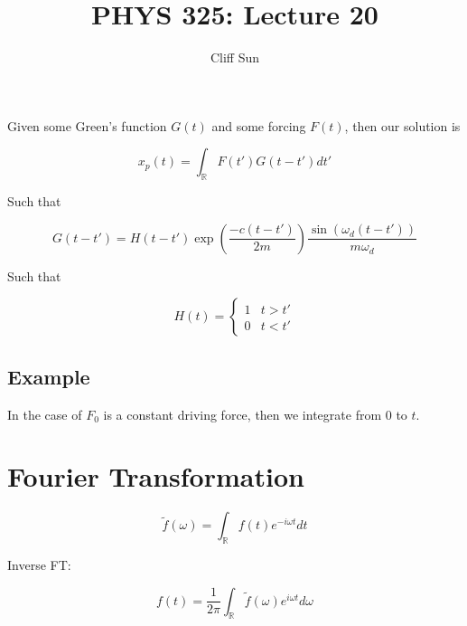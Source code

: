 \documentclass{article}
\title{PHYS 325: Lecture 20}
\author{Cliff Sun}
\newtheorem{one minute paper}[theorem]{One Minute Paper}
\begin{document}
\maketitle

Given some Green's function $G(t)$ and some forcing $F(t)$, then our solution is 

\begin{equation}
    x_p(t) = \int_{\mathbb{R}}F(t')G(t-t')dt'
\end{equation}

Such that 

\begin{equation}
    G(t-t') = H(t-t')\exp\left(\frac{-c(t-t')}{2m}\right)\frac{\sin(\omega_d(t-t'))}{m\omega_d}
\end{equation}

Such that 

\begin{equation}
    H(t) = \begin{cases}
        1 & t > t' \\
        0 & t < t' 
    \end{cases}
\end{equation}

\subsection*{Example}

In the case of $F_0$ is a constant driving force, then we integrate from $0$ to $t$. 

\section*{Fourier Transformation}

\begin{equation}
    \tilde{f}(\omega) = \int_\mathbb{R}f(t)e^{-i\omega t}dt
\end{equation}

Inverse FT:

\begin{equation}
    f(t) = \frac{1}{2\pi}\int_\mathbb{R}\tilde{f}(\omega)e^{i\omega t}d\omega
\end{equation}
\end{document}
